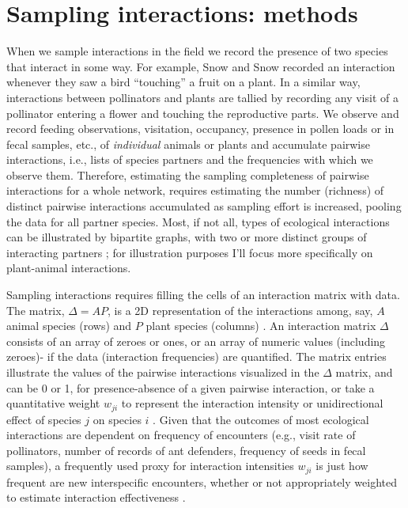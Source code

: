 \documentclass[12pt]{article}
\begin{document}
\section*{Sampling interactions: methods}
\label{samplinginteractions:methods}
When we sample interactions in the field we record the presence of two species that interact in some way. For example, Snow and Snow\citep{Snow:1988iu} recorded an interaction whenever they saw a bird ``touching'' a fruit on a plant. In a similar way, interactions between pollinators and plants are tallied by recording any visit of a pollinator entering a flower and touching the reproductive parts. We observe and record feeding observations, visitation, occupancy, presence in pollen loads or in fecal samples, etc., of \emph{individual} animals or plants and accumulate pairwise interactions, i.e., lists of species partners and the frequencies with which we observe them. Therefore, estimating the sampling completeness of pairwise interactions for a whole network, requires estimating the number (richness) of distinct pairwise interactions accumulated as sampling effort is increased, pooling the data for all partner species. Most, if not all, types of ecological interactions can be illustrated by bipartite graphs, with two or more distinct groups of interacting partners \citep{Bascompte:2014to}; for illustration purposes I'll focus more specifically on plant-animal interactions.

Sampling interactions requires filling the cells of an interaction matrix with data. The matrix, $\Delta= AP$, is a 2D representation of the interactions among, say, $A$ animal species (rows) and $P$ plant species (columns) \citep{E31/2562,Bascompte:2014to}. An interaction matrix $\Delta$ consists of an array of zeroes or ones, or an array of numeric values (including zeroes)- if the data (interaction frequencies) are quantified. The matrix entries illustrate the values of the pairwise interactions visualized in the $\Delta$ matrix, and can be 0 or 1, for presence-absence of a given pairwise interaction, or take a quantitative weight $w_{ji}$ to represent the interaction intensity or unidirectional effect of species $j$ on species $i$ \citep{Bascompte:2014to,Vazquez:2015ec}. Given that the outcomes of most ecological interactions are dependent on frequency of encounters (e.g., visit rate of pollinators, number of records of ant defenders, frequency of seeds in fecal samples), a frequently used proxy for interaction intensities $w_{ji}$ is just how frequent are new interspecific encounters, whether or not appropriately weighted to estimate interaction effectiveness \citep{Vazquez:2005}. 
\end{document}
